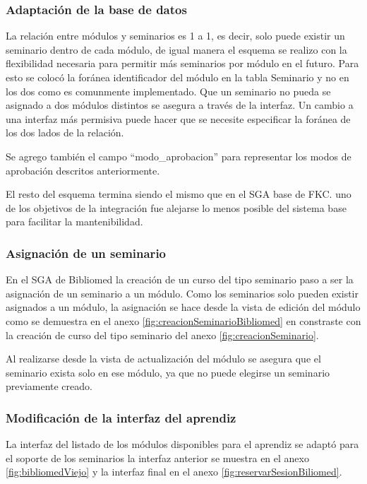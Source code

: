 \subsubsection{Adaptación de la base de datos}

La relación entre módulos y seminarios es 1 a 1, es decir, solo puede existir un seminario dentro de cada módulo, de igual manera el esquema se realizo con la flexibilidad necesaria para permitir más seminarios por módulo en el futuro. Para esto se colocó la foránea identificador del módulo en la tabla Seminario y no en los dos como es comunmente implementado. Que un seminario no pueda se asignado a dos módulos distintos se asegura a través de la interfaz. Un cambio a una interfaz más permisiva puede hacer que se necesite especificar la foránea de los dos lados de la relación. 

Se agrego también el campo ``modo\_aprobacion'' para representar los modos de aprobación descritos anteriormente.

El resto del esquema termina siendo el mismo que en el SGA base de FKC. uno de los objetivos de la integración fue alejarse lo menos posible del sistema base para facilitar la mantenibilidad.

\subsubsection{Asignación de un seminario}

En el SGA de Bibliomed la creación de un curso del tipo seminario paso a ser la asignación de un seminario a un módulo. Como los seminarios solo pueden existir asignados a un módulo, la asignación se hace desde la vista de edición del módulo como se demuestra en el anexo \ref{fig:creacionSeminarioBibliomed} en constraste con la creación de curso del tipo seminario del anexo \ref{fig:creacionSeminario}.

Al realizarse desde la vista de actualización del módulo se asegura que el seminario exista solo en ese módulo, ya que no puede elegirse un seminario previamente creado.

\subsubsection{Modificación de la interfaz del aprendiz}

La interfaz del listado de los módulos disponibles para el aprendiz se adaptó para el soporte de los seminarios la interfaz anterior se muestra en el anexo \ref{fig:bibliomedViejo} y la interfaz final en el anexo \ref{fig:reservarSesionBiliomed}.

